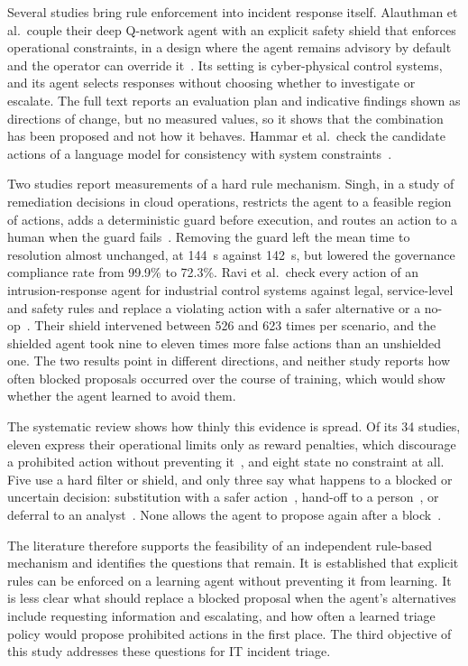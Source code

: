 Several studies bring rule enforcement into incident response itself. Alauthman et al.\ couple their deep Q-network agent with an explicit safety shield that enforces operational constraints, in a design where the agent remains advisory by default and the operator can override it~\cite{alauthman2026}. Its setting is cyber-physical control systems, and its agent selects responses without choosing whether to investigate or escalate. The full text reports an evaluation plan and indicative findings shown as directions of change, but no measured values, so it shows that the combination has been proposed and not how it behaves. Hammar et al.\ check the candidate actions of a language model for consistency with system constraints~\cite{hammar2026llm}.

Two studies report measurements of a hard rule mechanism. Singh, in a study of remediation decisions in cloud operations, restricts the agent to a feasible region of actions, adds a deterministic guard before execution, and routes an action to a human when the guard fails~\cite{singh2026}. Removing the guard left the mean time to resolution almost unchanged, at 144~s against 142~s, but lowered the governance compliance rate from 99.9\% to 72.3\%. Ravi et al.\ check every action of an intrusion-response agent for industrial control systems against legal, service-level and safety rules and replace a violating action with a safer alternative or a no-op~\cite{ravi2025}. Their shield intervened between 526 and 623 times per scenario, and the shielded agent took nine to eleven times more false actions than an unshielded one. The two results point in different directions, and neither study reports how often blocked proposals occurred over the course of training, which would show whether the agent learned to avoid them.

The systematic review shows how thinly this evidence is spread. Of its 34 studies, eleven express their operational limits only as reward penalties, which discourage a prohibited action without preventing it~\cite{konighofer2025}, and eight state no constraint at all. Five use a hard filter or shield, and only three say what happens to a blocked or uncertain decision: substitution with a safer action~\cite{ravi2025}, hand-off to a person~\cite{singh2026}, or deferral to an analyst~\cite{sahin2026}. None allows the agent to propose again after a block~\cite{opol2026slr}.

The literature therefore supports the feasibility of an independent rule-based mechanism and identifies the questions that remain. It is established that explicit rules can be enforced on a learning agent without preventing it from learning. It is less clear what should replace a blocked proposal when the agent's alternatives include requesting information and escalating, and how often a learned triage policy would propose prohibited actions in the first place. The third objective of this study addresses these questions for IT incident triage.


